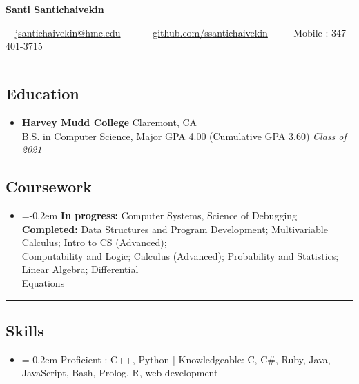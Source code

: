 \documentclass[10.5pt,letterpaper]{article}
\begin{document}
\begin{center}
{\Large \textbf{Santi Santichaivekin}}

\ \ \href{mailto:jsantichaivekin@hmc.edu}{jsantichaivekin@hmc.edu}\ \ 
\ \ \textbullet
\ \ \href{https://github.com/ssantichaivekin}{github.com/ssantichaivekin}
\ \ \textbullet
\ \ Mobile : 347-401-3715

\end{center}


\hrule
\vspace{-1.0em}
\subsection*{Education}
  \begin{itemize}
    \parskip=-0.5em

    \item[]
    \textbf{Harvey Mudd College} \hfill
      Claremont, CA\\
    {B.S. in Computer Science, Major GPA 4.00 (Cumulative GPA 3.60) \hfill \emph{Class of 2021}}
  \end{itemize}
  \vspace{-2.2em}
\subsection*{Coursework}
\begin{itemize}
\item[]
    \parskip=-0.2em
  \textbf{In progress:}  Computer Systems, Science of Debugging\\
  \textbf{Completed:} Data Structures and Program Development; 
  Multivariable Calculus;
  Intro to CS (Advanced); \\
  Computability and Logic; 
  Calculus (Advanced); 
  Probability and Statistics;
  Linear Algebra;
  Differential \\
  Equations

\end{itemize}

\hrule
\vspace{-1.0em}
\subsection*{Skills}
\begin{itemize}
\item[]
    \parskip=-0.2em
  Proficient : C++, Python | Knowledgeable: C, C\#, Ruby, Java, JavaScript, Bash, Prolog, R, web development
    
\end{itemize}
\end{document}
